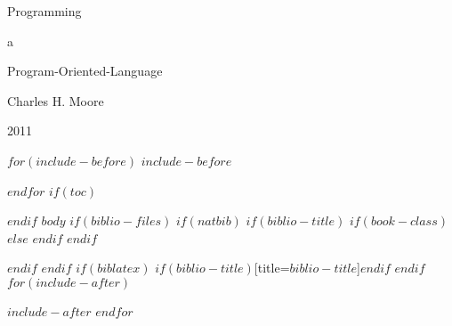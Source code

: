 \documentclass[10pt,letterpaper]{memoir}
\begin{document}
	\vspace*{\fill}
	\begin{center}
	\HUGE\textsf{Programming}\par
	\end{center}
	\begin{center}
	\LARGE\textsf{a}\par
	\end{center}
	\begin{center}
	\HUGE\textsf{Program-Oriented-Language}\par
	\end{center}

	\begin{center}
	\Huge\textsf{}\par
	\end{center}
	\begin{center}
	\LARGE\textsf{Charles H. Moore}\par
	\textrm{\normalsize 2011} \\
	\end{center}
	\vspace*{\fill}
	\begin{center}
	\end{center}
	\clearpage

$for(include-before)$
$include-before$

$endfor$
$if(toc)$
\tableofcontents

$endif$
$body$
$if(biblio-files)$
$if(natbib)$
$if(biblio-title)$
$if(book-class)$
\renewcommand\bibname{$biblio-title$}
$else$
\renewcommand\refname{$biblio-title$}
$endif$
$endif$

$endif$
$endif$
$if(biblatex)$
\printbibliography$if(biblio-title)$[title=$biblio-title$]$endif$
$endif$
$for(include-after)$

$include-after$
$endfor$
\end{document}
